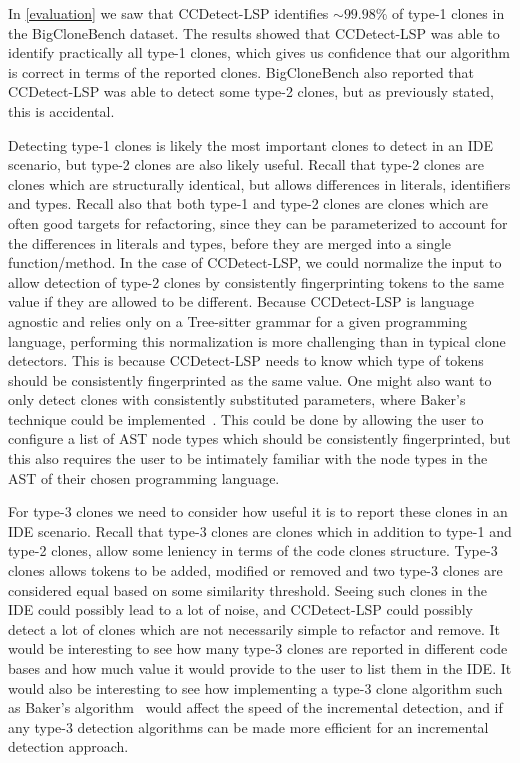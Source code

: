 In \cref{evaluation} we saw that CCDetect-LSP identifies ${\sim}99.98\%$ of type-1 clones in
the BigCloneBench dataset. The results showed that CCDetect-LSP was able to identify
practically all type-1 clones, which gives us confidence that our algorithm is correct in
terms of the reported clones. BigCloneBench also reported that CCDetect-LSP was able to
detect some type-2 clones, but as previously stated, this is accidental.

Detecting type-1 clones is likely the most important clones to detect in an IDE scenario,
but type-2 clones are also likely useful. Recall that type-2 clones are clones which are
structurally identical, but allows differences in literals, identifiers and types. Recall
also that both type-1 and type-2 clones are clones which are often good targets for
refactoring, since they can be parameterized to account for the differences in literals
and types, before they are merged into a single function/method. In the case of
CCDetect-LSP, we could normalize the input to allow detection of type-2 clones by
consistently fingerprinting tokens to the same value if they are allowed to be different.
Because CCDetect-LSP is language agnostic and relies only on a Tree-sitter grammar for a
given programming language, performing this normalization is more challenging than in
typical clone detectors. This is because CCDetect-LSP needs to know which type of tokens
should be consistently fingerprinted as the same value. One might also want to only detect
clones with consistently substituted parameters, where Baker's technique could be
implemented~\cite{Bakerdup}. This could be done by allowing the user to configure a list
of AST node types which should be consistently fingerprinted, but this also requires the
user to be intimately familiar with the node types in the AST of their chosen programming
language.

For type-3 clones we need to consider how useful it is to report these clones in an IDE
scenario. Recall that type-3 clones are clones which in addition to type-1 and type-2
clones, allow some leniency in terms of the code clones structure. Type-3 clones allows
tokens to be added, modified or removed and two type-3 clones are considered equal based
on some similarity threshold. Seeing such clones in the IDE could possibly lead to a lot
of noise, and CCDetect-LSP could possibly detect a lot of clones which are not necessarily
simple to refactor and remove. It would be interesting to see how many type-3 clones are
reported in different code bases and how much value it would provide to the user to list
them in the IDE. It would also be interesting to see how implementing a type-3 clone
algorithm such as Baker's algorithm~\cite{BakerLCS} would affect the speed of the
incremental detection, and if any type-3 detection algorithms can be made more efficient
for an incremental detection approach.
